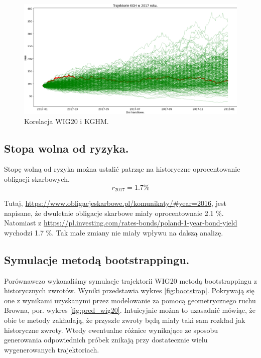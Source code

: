 \documentclass[12pt]{article}
\begin{document}
\begin{figure}[H]
    \centering
    \includegraphics[width=\textwidth,height=\textheight,keepaspectratio]{corr_kghm.png}
    \caption{Korelacja WIG20 i KGHM.}
    \label{fig:corr_kghm}
\end{figure}

\subsection{Stopa wolna od ryzyka.}

Stopę wolną od ryzyka można ustalić patrząc na historyczne oprocentowanie obligacji skarbowych. 
$$
r_{2017} = 1.7\%
$$

Tutaj, \url{https://www.obligacjeskarbowe.pl/komunikaty/#year=2016}, jest napisane, że dwuletnie obligacje skarbowe miały oprocentownaie 2.1 \%. Natomiast z \url{https://pl.investing.com/rates-bonds/poland-1-year-bond-yield} wychodzi 1.7 \%. Tak małe zmiany nie miały wpływu na dalszą analizę.


\subsection{Symulacje metodą bootstrappingu.}

Porównawczo wykonaliśmy symulacje trajektorii WIG20 metodą bootstrappingu  z historycznych zwrotów. Wyniki przedstawia wykres \ref{fig:bootstrap}. Pokrywają się one z wynikami uzyskanymi przez modelowanie za pomocą geometrycznego ruchu Browna, por. wykres \ref{fig:pred_wig20}. Intuicyjnie można to uzasadnić mówiąc, że obie te metody zakładają, że przyszłe zwroty będą miały taki sam rozkład jak historyczne zwroty. Wtedy ewentualne różnice wynikające ze sposobu generowania odpowiednich próbek znikają przy dostatecznie wielu wygenerowanych trajektoriach.
\end{document}
